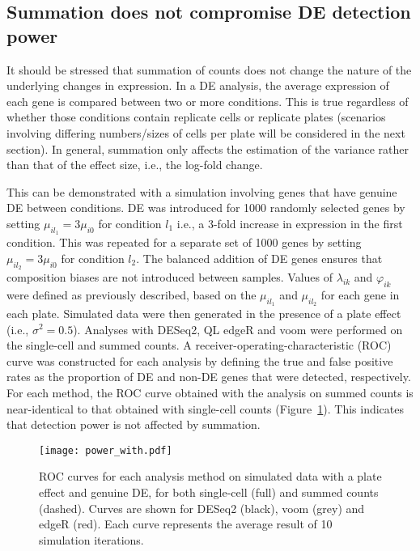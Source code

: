 \documentclass{article}
\begin{document}
\subsection{Summation does not compromise DE detection power}
It should be stressed that summation of counts does not change the nature of the underlying changes in expression.
In a DE analysis, the average expression of each gene is compared between two or more conditions.
This is true regardless of whether those conditions contain replicate cells or replicate plates 
    (scenarios involving differing numbers/sizes of cells per plate will be considered in the next section).
In general, summation only affects the estimation of the variance rather than that of the effect size, i.e., the log-fold change.

This can be demonstrated with a simulation involving genes that have genuine DE between conditions.
DE was introduced for 1000 randomly selected genes by setting $\mu_{il_1} = 3\mu_{i0}$ for condition $l_1$ i.e., a 3-fold increase in expression in the first condition.
This was repeated for a separate set of 1000 genes by setting $\mu_{il_2} = 3\mu_{i0}$ for condition $l_2$.
The balanced addition of DE genes ensures that composition biases \cite{robinson2010scaling} are not introduced between samples.
Values of $\lambda_{ik}$ and $\varphi_{ik}$ were defined as previously described, based on the $\mu_{il_1}$ and $\mu_{il_2}$ for each gene in each plate.
Simulated data were then generated in the presence of a plate effect (i.e., $\sigma^2=0.5$).
Analyses with DESeq2, QL edgeR and voom were performed on the single-cell and summed counts.
A receiver-operating-characteristic (ROC) curve was constructed for each analysis by defining the true and false positive rates as the proportion of DE and non-DE genes that were detected, respectively.
For each method, the ROC curve obtained with the analysis on summed counts is near-identical to that obtained with single-cell counts (Figure~\ref{fig:roc}).
This indicates that detection power is not affected by summation.

\begin{figure}[tbp]
\begin{center}
\texttt{[image: power\_with.pdf]}
\end{center}
\caption{
    ROC curves for each analysis method on simulated data with a plate effect and genuine DE, for both single-cell (full) and summed counts (dashed).
    Curves are shown for DESeq2 (black), voom (grey) and edgeR (red).
    Each curve represents the average result of 10 simulation iterations.
}
\label{fig:roc}
\end{figure}
\end{document}
